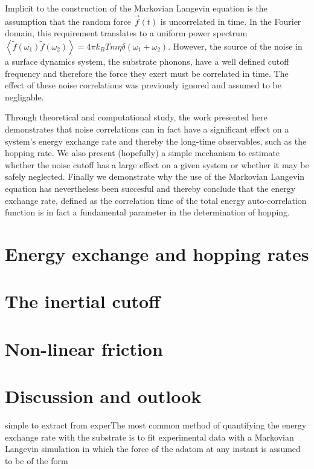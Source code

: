 \documentclass[7pt]{article}
\begin{document}
Implicit to the construction of the Markovian Langevin equation is the assumption that the random force $\vec{f}(t)$ is uncorrelated in time. In the Fourier domain, this requirement translates to a uniform power spectrum $\left<\tilde{f}(\omega_1)\tilde{f}(\omega_2)\right>=4\pi k_BTm\eta\delta(\omega_1+\omega_2)$. However, the source of the noise in a surface dynamics system, the substrate phonons, have a well defined cutoff frequency and therefore the force they exert must be correlated in time. The effect of these noise correlations was previously ignored and assumed to be negligable. 

Through theoretical and computational study, the work presented here demonstrates that noise correlations can in fact have a significant effect on a system's energy exchange rate and thereby the long-time observables, such as the hopping rate. We also present (hopefully) a simple mechanism to estimate whether the noise cutoff has a large effect on a given system or whether it may be safely neglected. Finally we demonstrate why the use of the Markovian Langevin equation has nevertheless been succesful and thereby conclude that the energy exchange rate, defined as the correlation time of the total energy auto-correlation function is in fact a fundamental parameter in the determination of hopping. 

\section*{Energy exchange and hopping rates}

\section*{The inertial cutoff}

\section*{Non-linear friction}

\section*{Discussion and outlook}

simple to extract from experThe most common method of quantifying the energy exchange rate with the substrate is to fit experimental data with a Markovian Langevin simulation in which the force of the adatom at any instant is assumed to be of the form 
\end{document}

